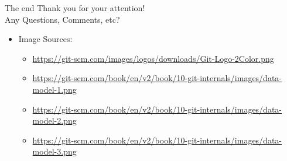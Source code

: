 \documentclass{beamer}
\begin{document}
    
    

    \begin{frame}{The end}
      {\huge
        Thank you for your attention!\\
        Any Questions, Comments, etc?
      }
      
      \begin{itemize}
        \item Image Sources: 
        \begin{itemize}
          \item \url{https://git-scm.com/images/logos/downloads/Git-Logo-2Color.png}
          \item
          \url{https://git-scm.com/book/en/v2/book/10-git-internals/images/data-model-1.png}
          \item
          \url{https://git-scm.com/book/en/v2/book/10-git-internals/images/data-model-2.png}
          \item
          \url{https://git-scm.com/book/en/v2/book/10-git-internals/images/data-model-3.png}
        \end{itemize}  
      \end{itemize}
    \end{frame}
\end{document}
